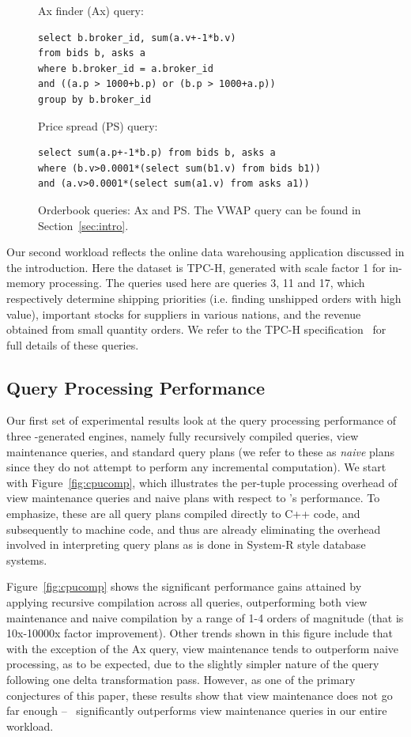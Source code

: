 \begin{figure}[htbp]
Ax finder (Ax) query:
\begin{Verbatim}
select b.broker_id, sum(a.v+-1*b.v)
from bids b, asks a
where b.broker_id = a.broker_id
and ((a.p > 1000+b.p) or (b.p > 1000+a.p))
group by b.broker_id
\end{Verbatim}
Price spread (PS) query:
\begin{Verbatim}
select sum(a.p+-1*b.p) from bids b, asks a
where (b.v>0.0001*(select sum(b1.v) from bids b1))
and (a.v>0.0001*(select sum(a1.v) from asks a1))
\end{Verbatim}
\caption{Orderbook queries: Ax and PS. The VWAP query can be found in
  Section~\ref{sec:intro}.}
\label{fig:obqueries}
\end{figure}

Our second workload reflects the online data warehousing application discussed
in the introduction. Here the dataset is TPC-H, generated with scale factor 1
for in-memory processing. The queries used here are queries 3, 11 and 17, which
respectively determine shipping priorities (i.e. finding unshipped orders with
high value), important stocks for suppliers in various nations, and the revenue
obtained from small quantity orders. We refer to the TPC-H
specification~\cite{tpch-url} for full details of these queries.

\subsection{Query Processing Performance}
Our first set of experimental results look at the query processing performance
of three \compiler-generated engines, namely fully recursively compiled queries,
view maintenance queries, and standard query plans (we refer to these as
\textit{naive} plans since they do not attempt to perform any incremental
computation). We start with Figure~\ref{fig:cpucomp}, which illustrates the
per-tuple processing overhead of view maintenance queries and naive plans with
respect to \compiler's performance. To emphasize, these are all query plans
compiled directly to C++ code, and subsequently to machine code, and thus are
already eliminating the overhead involved in interpreting query plans as is done
in System-R style database systems.

Figure~\ref{fig:cpucomp} shows the significant performance gains attained by
applying recursive compilation across all queries, outperforming both view
maintenance and naive compilation by a range of 1-4 orders of magnitude (that is
10x-10000x factor improvement). Other trends shown in this figure include that
with the exception of the Ax query, view maintenance tends to outperform naive
processing, as to be expected, due to the slightly simpler nature of the query
following one delta transformation pass. However, as one of the primary
conjectures of this paper, these results show that view maintenance does not go
far enough -- \compiler\ significantly outperforms view maintenance queries in
our entire workload.

